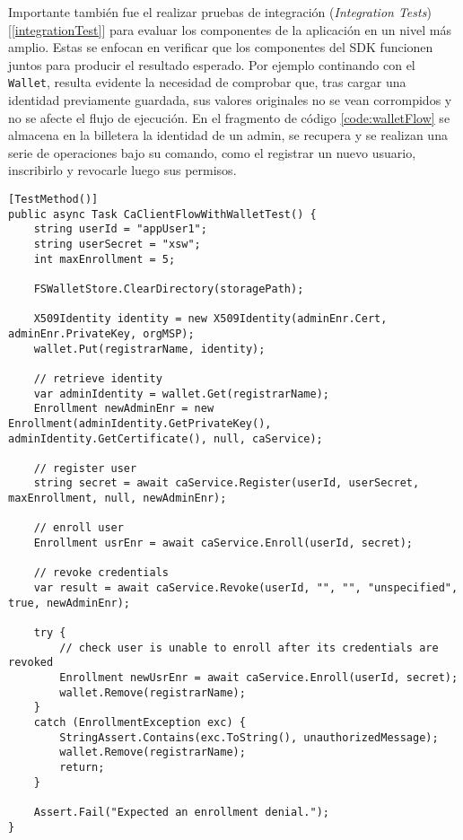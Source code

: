 
Importante tambi\'en fue el realizar pruebas de integraci\'on (\emph{Integration Tests}) [\ref{integrationTest}] para evaluar los componentes de la aplicación en un nivel más amplio. Estas se enfocan en verificar que los componentes del SDK funcionen juntos para producir el resultado esperado. Por ejemplo continando con el \texttt{Wallet}, resulta evidente la necesidad de comprobar que, tras cargar una identidad previamente guardada, sus valores originales no se vean corrompidos y no se afecte el flujo de ejecuci\'on. En el fragmento de c\'odigo \ref{code:walletFlow} se almacena en la billetera la identidad de un admin, se recupera y se realizan una serie de operaciones bajo su comando, como el registrar un nuevo usuario, inscribirlo y revocarle luego sus permisos.

\begin{lstlisting}[caption={Test para verificar el comporamiento de un flujo completo utilizando identidades de una billetera.}, label={code:walletFlow}]
[TestMethod()]
public async Task CaClientFlowWithWalletTest() {
	string userId = "appUser1";
	string userSecret = "xsw";
	int maxEnrollment = 5;

	FSWalletStore.ClearDirectory(storagePath);

	X509Identity identity = new X509Identity(adminEnr.Cert, adminEnr.PrivateKey, orgMSP);
	wallet.Put(registrarName, identity);

	// retrieve identity
	var adminIdentity = wallet.Get(registrarName);
	Enrollment newAdminEnr = new Enrollment(adminIdentity.GetPrivateKey(), adminIdentity.GetCertificate(), null, caService);

	// register user
	string secret = await caService.Register(userId, userSecret, maxEnrollment, null, newAdminEnr);

	// enroll user
	Enrollment usrEnr = await caService.Enroll(userId, secret);

	// revoke credentials
	var result = await caService.Revoke(userId, "", "", "unspecified", true, newAdminEnr);

	try {
		// check user is unable to enroll after its credentials are revoked
		Enrollment newUsrEnr = await caService.Enroll(userId, secret);
		wallet.Remove(registrarName);
	}
	catch (EnrollmentException exc) {
		StringAssert.Contains(exc.ToString(), unauthorizedMessage);
		wallet.Remove(registrarName);
		return;
	}

	Assert.Fail("Expected an enrollment denial.");
}
\end{lstlisting}

